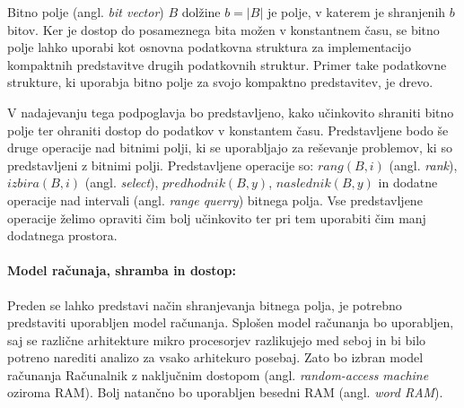 Bitno polje (angl. \textit{bit vector}) $B$ dolžine $b=|B|$ je polje, v katerem je shranjenih $b$ bitov. Ker je dostop do posameznega bita možen v konstantnem času, se bitno polje lahko uporabi kot osnovna podatkovna struktura za implementacijo kompaktnih predstavitve drugih podatkovnih struktur. Primer take podatkovne strukture, ki uporabja bitno polje za svojo kompaktno predstavitev, je drevo.

V nadajevanju tega podpoglavja bo predstavljeno, kako učinkovito shraniti bitno polje ter ohraniti dostop do podatkov v konstantem času. Predstavljene bodo še druge operacije nad bitnimi polji, ki se uporabljajo za reševanje problemov, ki so predstavljeni z bitnimi polji. Predstavljene operacije so: $rang(B,i)$ (angl. \textit{rank}), $izbira(B,i)$ (angl. \textit{select}), $predhodnik(B,y)$, $naslednik(B,y)$ in dodatne operacije nad intervali (angl. \textit{range querry}) bitnega polja. Vse predstavljene operacije želimo opraviti čim bolj učinkovito ter pri tem uporabiti čim manj dodatnega prostora.

%

\paragraph{Model računaja, shramba in dostop:}
Preden se lahko predstavi način shranjevanja bitnega polja, je potrebno predstaviti uporabljen model računanja. Splošen model računanja bo uporabljen, saj se različne arhitekture mikro procesorjev razlikujejo med seboj in bi bilo potreno narediti analizo za vsako arhitekuro posebaj. Zato bo izbran model računanja Računalnik z naključnim dostopom (angl. \textit{random-access machine} oziroma RAM). Bolj natančno bo uporabljen besedni RAM  (angl. \textit{word RAM}).

